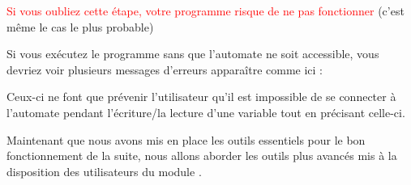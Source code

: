 \textcolor{red}{Si vous oubliez cette étape, votre programme risque de ne pas fonctionner} (c'est même le cas le plus probable)


Si vous exécutez le programme sans que l'automate ne soit accessible, vous devriez voir plusieurs messages d'erreurs apparaître comme ici :


Ceux-ci ne font que prévenir l'utilisateur qu'il est impossible de se connecter à l'automate pendant l'écriture/la lecture d'une variable tout en précisant celle-ci.
\smallSkip

Maintenant que nous avons mis en place les outils essentiels pour le bon fonctionnement de la suite, nous allons aborder les outils plus avancés mis à la disposition des utilisateurs du module .\smallSkip

